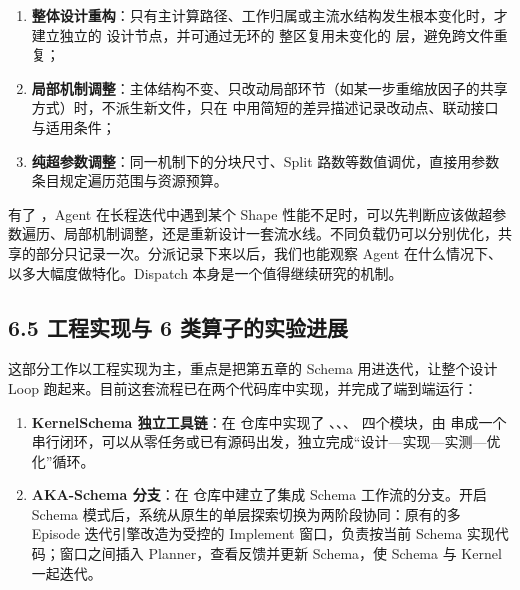 \begin{enumerate}[start=1]
\item
\textbf{整体设计重构}：只有主计算路径、工作归属或主流水结构发生根本变化时，才建立独立的  设计节点，并可通过无环的  整区复用未变化的  层，避免跨文件重复；


\item
\textbf{局部机制调整}：主体结构不变、只改动局部环节（如某一步重缩放因子的共享方式）时，不派生新文件，只在  中用简短的差异描述记录改动点、联动接口与适用条件；


\item
\textbf{纯超参数调整}：同一机制下的分块尺寸、Split 路数等数值调优，直接用参数条目规定遍历范围与资源预算。


\end{enumerate}

有了 ，Agent 在长程迭代中遇到某个 Shape 性能不足时，可以先判断应该做超参数遍历、局部机制调整，还是重新设计一套流水线。不同负载仍可以分别优化，共享的部分只记录一次。分派记录下来以后，我们也能观察 Agent 在什么情况下、以多大幅度做特化。Dispatch 本身是一个值得继续研究的机制。


\SourceSeparator
\subsection{6.5 工程实现与 6 类算子的实验进展}
这部分工作以工程实现为主，重点是把第五章的 Schema 用进迭代，让整个设计 Loop 跑起来。目前这套流程已在两个代码库中实现，并完成了端到端运行：


\begin{enumerate}[start=1]
\item
\textbf{KernelSchema 独立工具链}：在  仓库中实现了 、、、 四个模块，由  串成一个串行闭环，可以从零任务或已有源码出发，独立完成“设计—实现—实测—优化”循环。


\item
\textbf{AKA-Schema 分支}：在  仓库中建立了集成 Schema 工作流的分支。开启 Schema 模式后，系统从原生的单层探索切换为两阶段协同：原有的多 Episode 迭代引擎改造为受控的 Implement 窗口，负责按当前 Schema 实现代码；窗口之间插入 Planner，查看反馈并更新 Schema，使 Schema 与 Kernel 一起迭代。


\end{enumerate}

